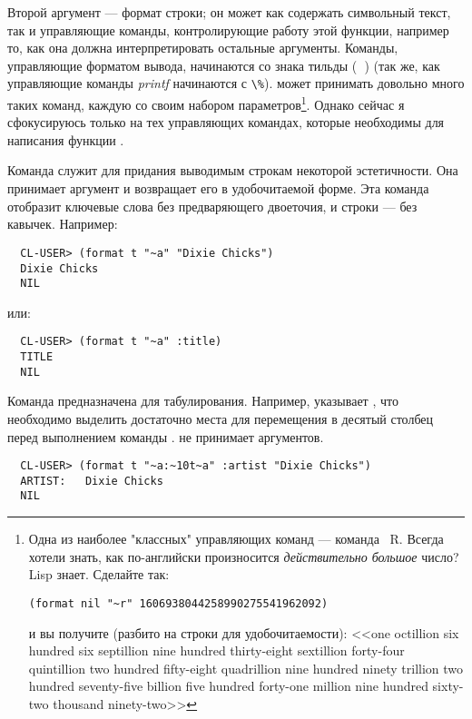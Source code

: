 Второй аргумент  --- формат строки; он может как содержать символьный текст,
так и управляющие команды, контролирующие работу этой функции, например то, как она должна
интерпретировать остальные аргументы. Команды, управляющие форматом вывода, начинаются со
знака тильды (\textbf{~}) (так же, как управляющие команды \textit{printf} начинаются с
\lstinline{\%}).  может принимать довольно много таких команд, каждую со
своим набором параметров\footnote{Одна из наиболее "классных" управляющих команд
   --- команда ~R. Всегда хотели знать, как по-английски произносится
  \textit{действительно большое} число? Lisp знает. Сделайте так:

\begin{lstlisting}
(format nil "~r" 1606938044258990275541962092)
\end{lstlisting}

и вы получите (разбито на строки для удобочитаемости): <<one octillion six hundred six
septillion nine hundred thirty-eight sextillion forty-four quintillion two hundred
fifty-eight quadrillion nine hundred ninety trillion two hundred seventy-five billion five
hundred forty-one million nine hundred sixty-two thousand ninety-two>>}. Однако сейчас я
сфокусируюсь только на тех управляющих командах, которые необходимы для написания функции
.

Команда  служит для придания выводимым строкам некоторой эстетичности. Она
принимает аргумент и возвращает его в удобочитаемой форме. Эта команда отобразит ключевые
слова без предваряющего двоеточия, и строки --- без кавычек. Например:

\begin{verbatim}
  CL-USER> (format t "~a" "Dixie Chicks")
  Dixie Chicks
  NIL
\end{verbatim}

или:

\begin{verbatim}
  CL-USER> (format t "~a" :title)
  TITLE
  NIL
\end{verbatim}

Команда  предназначена для табулирования. Например,  указывает
, что необходимо выделить достаточно места для перемещения в десятый столбец
перед выполнением команды .  не принимает аргументов.

\begin{verbatim}
  CL-USER> (format t "~a:~10t~a" :artist "Dixie Chicks")
  ARTIST:   Dixie Chicks
  NIL
\end{verbatim}

